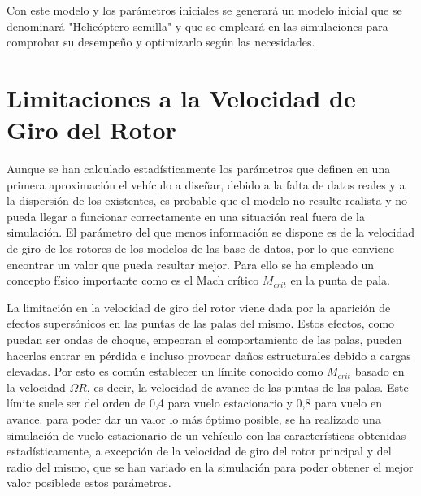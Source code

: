 Con este modelo y los parámetros iniciales se generará un modelo inicial que se denominará "Helicóptero semilla" y que se empleará en las simulaciones para comprobar su desempeño y optimizarlo según las necesidades.

\section{Limitaciones a la Velocidad de Giro del Rotor}

Aunque se han calculado estadísticamente los parámetros que definen en una primera aproximación el vehículo a diseñar, debido a la falta de datos reales y a la dispersión de los existentes, es probable que el modelo no resulte realista y no pueda llegar a funcionar correctamente en una situación real fuera de la simulación. El parámetro del que menos información se dispone es de la velocidad de giro de los rotores de los modelos de las base de datos, por lo que conviene encontrar un valor que pueda resultar mejor. Para ello se ha empleado un concepto físico importante como es el Mach crítico $M_{crit}$ en la punta de pala.

La limitación en la velocidad de giro del rotor viene dada por la aparición de efectos supersónicos en las puntas de las palas del mismo. Estos efectos, como puedan ser ondas de choque, empeoran el comportamiento de las palas, pueden hacerlas entrar en pérdida e incluso provocar daños estructurales debido a cargas elevadas.
Por esto es común establecer un límite conocido como $M_{crit}$ basado en la velocidad $\Omega R$, es decir, la velocidad de avance de las puntas de las palas. Este límite suele ser del orden de 0,4 para vuelo estacionario y 0,8 para vuelo en avance. 
para poder dar un valor lo más óptimo posible, se ha realizado una simulación de vuelo estacionario de un vehículo con las características obtenidas estadísticamente, a excepción de la velocidad de giro del rotor principal y del radio del mismo, que se han variado en la simulación para poder obtener el mejor valor posiblede estos parámetros.


